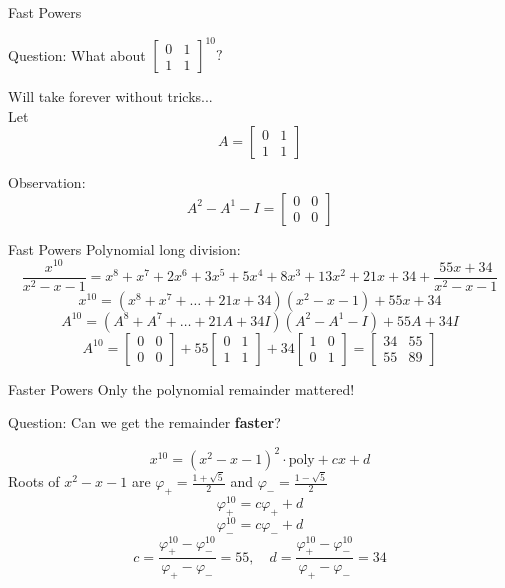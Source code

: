 \documentclass{beamer}
\begin{document}
\begin{frame}{Fast Powers}
\begin{block}{Question:}
What about
$\left[\begin{array}{cc}
0 & 1\\
1 & 1
\end{array}\right]^{10}?$
\end{block}
\pause
Will take forever without tricks...\\
\pause
Let
$$A = \left[\begin{array}{cc}
0 & 1\\
1 & 1
\end{array}\right]$$
\pause
\begin{block}{Observation:}
$$A^2 - A^1 - I = \left[\begin{array}{cc}
0 & 0\\
0 & 0
\end{array}\right]$$
\end{block}
\end{frame}

\begin{frame}{Fast Powers}
Polynomial long division:\\
{\small
$$\frac{x^{10}}{x^2-x-1} = 
x^8 + x^7 + 2 x^6 + 3 x^5 + 5 x^4 + 8 x^3 + 13 x^2 +  21 x + 34 + \frac{55 x + 34}{x^2 - x - 1}$$
}
\pause
$$x^{10} = (x^8 + x^7 + \dots + 21x + 34)(x^2-x-1) + 55x + 34$$
\pause
$$A^{10} = (A^8 + A^7 + \dots + 21A + 34I)(A^2-A^1-I) + 55A + 34I$$
\pause
$$A^{10} = \left[\begin{array}{cc}
0 & 0\\
0 & 0
\end{array}\right] + 55\left[\begin{array}{cc}
0 & 1\\
1 & 1
\end{array}\right] + 34\left[\begin{array}{cc}
1 & 0\\
0 & 1
\end{array}\right] = \left[\begin{array}{cc}
34 & 55\\
55 & 89
\end{array}\right]$$
\end{frame}

\begin{frame}{Faster Powers}
Only the polynomial remainder mattered!
\pause
\begin{block}{Question:}
Can we get the remainder \textbf{faster}?
\end{block}
\pause
$$x^{10} = (x^2-x-1)^2\cdot\text{poly} + cx + d$$
\pause
Roots of $x^2-x-1$ are $\varphi_+ = \frac{1+\sqrt{5}}{2}$ and $\varphi_- =  \frac{1-\sqrt{5}}{2}$
\pause
$$\varphi_+^{10} =  c\varphi_+ + d$$
$$\varphi_-^{10} =  c\varphi_- + d$$
\pause
$$c = \frac{\varphi_+^{10}-\varphi_-^{10}}{\varphi_+-\varphi_-} = 55,\quad d = \frac{\varphi_+^{10}-\varphi_-^{10}}{\varphi_+-\varphi_-} = 34$$
\end{frame}
\end{document}
